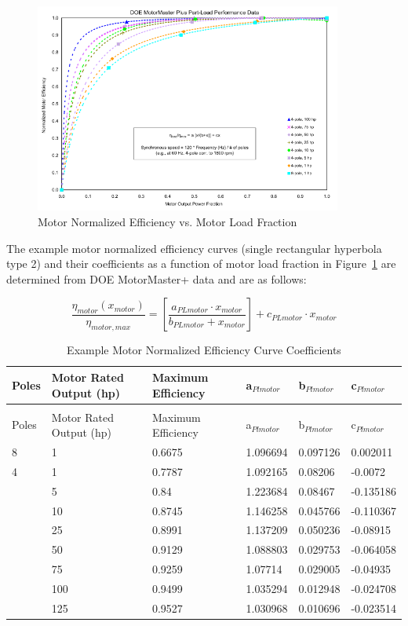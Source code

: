 \begin{figure}[hbtp] %
\centering
\includegraphics[width=0.9\textwidth, height=0.9\textheight, keepaspectratio=true]{media/image4919.svg.png}
\caption{Motor Normalized Efficiency vs. Motor Load Fraction \protect \label{fig:motor-normalized-efficiency-vs.-motor-load}}
\end{figure}

The example motor normalized efficiency curves (single rectangular hyperbola type 2) and their coefficients as a function of motor load fraction in Figure~\ref{fig:motor-normalized-efficiency-vs.-motor-load} are determined from DOE MotorMaster+ data and are as follows:

\begin{equation}
\frac{{{\eta_{motor}}({x_{motor}})}}{{{\eta_{motor,max}}}} = \left[ {\frac{{{a_{PLmotor}} \cdot {x_{motor}}}}{{{b_{PLmotor}} + {x_{motor}}}}} \right] + {c_{PLmotor}} \cdot {x_{motor}}
\label{eq:etamotormaxPartLoad}
\end{equation}

\begin{longtable}[c]{p{1.0in}p{1.0in}p{1.0in}p{1.0in}p{1.0in}p{1.0in}}
\caption{Example Motor Normalized Efficiency Curve Coefficients \label{table:example-motor-normalized-efficiency-curve}} \tabularnewline
\toprule 
Poles & Motor Rated Output (hp) & Maximum Efficiency & a\(_{Plmotor}\) & b\(_{Plmotor}\) & c\(_{Plmotor}\) \tabularnewline \midrule
\midrule
\endfirsthead

\caption[]{Example Motor Normalized Efficiency Curve Coefficients} \tabularnewline
\toprule 
Poles & Motor Rated Output (hp) & Maximum Efficiency & a\(_{Plmotor}\) & b\(_{Plmotor}\) & c\(_{Plmotor}\) \tabularnewline \midrule
\midrule
\endhead

8 & 1 & 0.6675 & 1.096694 & 0.097126 & 0.002011 \tabularnewline
4 & 1 & 0.7787 & 1.092165 & 0.08206 & -0.0072 \tabularnewline
 & 5 & 0.84 & 1.223684 & 0.08467 & -0.135186 \tabularnewline
 & 10 & 0.8745 & 1.146258 & 0.045766 & -0.110367 \tabularnewline
 & 25 & 0.8991 & 1.137209 & 0.050236 & -0.08915 \tabularnewline
 & 50 & 0.9129 & 1.088803 & 0.029753 & -0.064058 \tabularnewline
 & 75 & 0.9259 & 1.07714 & 0.029005 & -0.04935 \tabularnewline
 & 100 & 0.9499 & 1.035294 & 0.012948 & -0.024708 \tabularnewline
 & 125 & 0.9527 & 1.030968 & 0.010696 & -0.023514 \tabularnewline
\bottomrule
\end{longtable}

